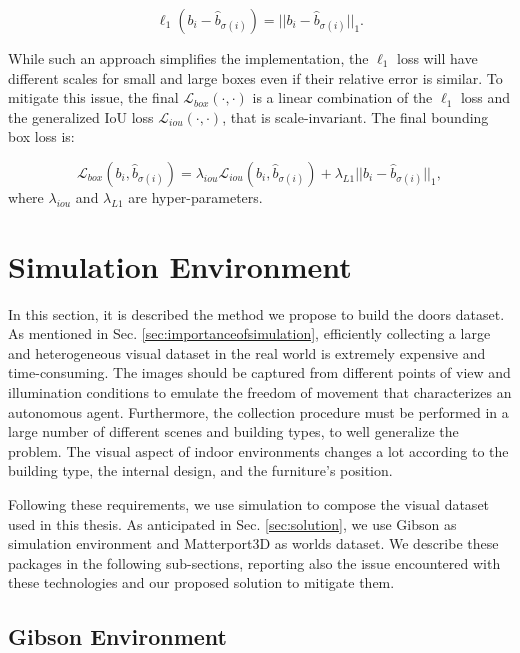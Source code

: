 \begin{equation}
\ell_1(b_i - \hat b_{\sigma(i)}) = ||b_i - \hat b_{\sigma(i)}||_1.
\end{equation}

While such an approach simplifies the implementation, the $\ell_1$ loss will have different scales for small and large boxes even if their relative error is similar. To mitigate this issue, the final $\mathcal{L}_{box}(\cdot, \cdot)$ is a linear combination of the $\ell_1$ loss and the generalized IoU loss \cite{generalizediou} $\mathcal{L}_{iou}(\cdot, \cdot)$, that is scale-invariant. The final bounding box loss is:

\begin{equation}
\label{eq:bounding_box_loss}
\mathcal{L}_{box}(b_i, \hat b_{\sigma(i)}) = \lambda_{iou}\mathcal{L}_{iou}(b_i, \hat b_{\sigma(i)}) + \lambda_{L1}||b_i - \hat b_{\sigma(i)}||_1,
\end{equation}
where $\lambda_{iou}$ and $\lambda_{L1}$ are hyper-parameters.

\section{Simulation Environment}

In this section, it is described the method we propose to build the doors dataset. As mentioned in Sec. \ref{sec:importanceofsimulation}, efficiently collecting a large and heterogeneous visual dataset in the real world is extremely expensive and time-consuming. The images should be captured from different points of view and illumination conditions to emulate the freedom of movement that characterizes an autonomous agent. Furthermore, the collection procedure must be performed in a large number of different scenes and building types, to well generalize the problem. The visual aspect of indoor environments changes a lot according to the building type, the internal design, and the furniture's position.

Following these requirements, we use simulation to compose the visual dataset used in this thesis. As anticipated in Sec. \ref{sec:solution}, we use Gibson \cite{gibson} as simulation environment and Matterport3D \cite{matterport} as worlds dataset. We describe these packages in the following sub-sections, reporting also the issue encountered with these technologies and our proposed solution to mitigate them.

\subsection{Gibson Environment}

